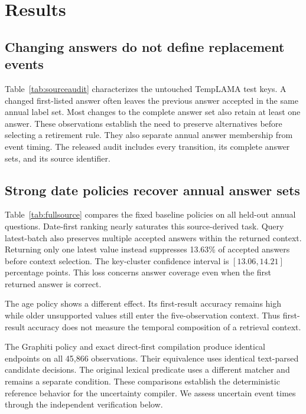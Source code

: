 \section{Results}
\label{sec:results}

\subsection{Changing answers do not define replacement events}

Table~\ref{tab:sourceaudit} characterizes the untouched TempLAMA test keys.
A changed first-listed answer often leaves the previous answer accepted in the same annual label set.
Most changes to the complete answer set also retain at least one answer.
These observations establish the need to preserve alternatives before selecting a retirement rule.
They also separate annual answer membership from event timing.
The released audit includes every transition, its complete answer sets, and its source identifier.


\subsection{Strong date policies recover annual answer sets}

Table~\ref{tab:fullsource} compares the fixed baseline policies on all held-out annual questions.
Date-first ranking nearly saturates this source-derived task.
Query latest-batch also preserves multiple accepted answers within the returned context.
Returning only one latest value instead suppresses 13.63\% of accepted answers before context selection.
The key-cluster confidence interval is $[13.06,14.21]$ percentage points.
This loss concerns answer coverage even when the first returned answer is correct.


The age policy shows a different effect.
Its first-result accuracy remains high while older unsupported values still enter the five-observation context.
Thus first-result accuracy does not measure the temporal composition of a retrieval context.

The Graphiti policy and exact direct-first compilation produce identical endpoints on all 45,866 observations.
Their equivalence uses identical text-parsed candidate decisions.
The original lexical predicate uses a different matcher and remains a separate condition.
These comparisons establish the deterministic reference behavior for the uncertainty compiler.
We assess uncertain event times through the independent verification below.

